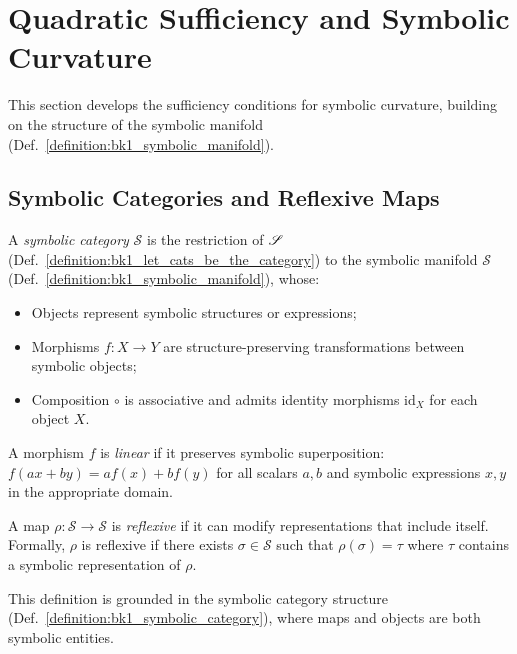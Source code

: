 \section{Quadratic Sufficiency and Symbolic Curvature}
\label{sec:bk1_quadratic_sufficiency_and_symbolic_curvature}

This section develops the sufficiency conditions for symbolic curvature, building on the structure of the symbolic manifold (Def.~\ref{definition:bk1_symbolic_manifold}).

\subsection{Symbolic Categories and Reflexive Maps}
\label{subsec:bk1_symbolic_categories_and_reflexive_maps}

\begin{definition}
\label{definition:bk1_symbolic_category}
A \emph{symbolic category} $\mathcal{S}$ is the restriction of $\mathscr{S}$ (Def.~\ref{definition:bk1_let_cats_be_the_category}) to the symbolic manifold $\mathcal{S}$ (Def.~\ref{definition:bk1_symbolic_manifold}), whose:
\begin{itemize}
  \item Objects represent symbolic structures or expressions;
  \item Morphisms $f: X \to Y$ are structure-preserving transformations between symbolic objects;
  \item Composition $\circ$ is associative and admits identity morphisms $\text{id}_X$ for each object $X$.
\end{itemize}
A morphism $f$ is \emph{linear} if it preserves symbolic superposition: $f(ax + by) = af(x) + bf(y)$ for all scalars $a,b$ and symbolic expressions $x,y$ in the appropriate domain.
\end{definition}

\begin{definition}
\label{definition:bk1_reflexive_update_map}
A map $\rho: \mathcal{S} \to \mathcal{S}$ is \emph{reflexive} if it can modify representations that include itself. Formally, $\rho$ is reflexive if there exists $\sigma \in \mathcal{S}$ such that $\rho(\sigma) = \tau$ where $\tau$ contains a symbolic representation of $\rho$.

This definition is grounded in the symbolic category structure (Def.~\ref{definition:bk1_symbolic_category}), where maps and objects are both symbolic entities.
\end{definition}

